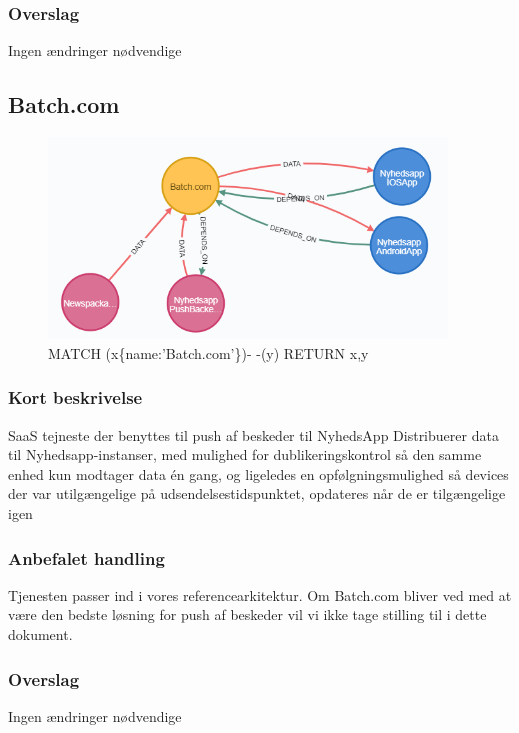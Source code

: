 \documentclass{article}
\begin{document}
\subsubsection{Overslag}
Ingen ændringer nødvendige



\subsection{Batch.com}
\begin{figure}[h]
\includegraphics[width=300pt]{Batch.com.PNG}
\caption{MATCH (x\{name:'Batch.com'\})- -(y) RETURN x,y}
\end{figure}
\subsubsection{Kort beskrivelse}
SaaS tejneste der benyttes til push af beskeder til NyhedsApp
Distribuerer data til Nyhedsapp-instanser, med mulighed for dublikeringskontrol så den samme enhed kun modtager data én gang, og ligeledes en opfølgningsmulighed så devices der var utilgængelige på udsendelsestidspunktet, opdateres når de er tilgængelige igen
\subsubsection{Anbefalet handling}
Tjenesten passer ind i vores referencearkitektur. Om Batch.com bliver ved med at være den bedste løsning for push af beskeder vil vi ikke tage stilling til i dette dokument.
\subsubsection{Overslag}
Ingen ændringer nødvendige
\end{document}
